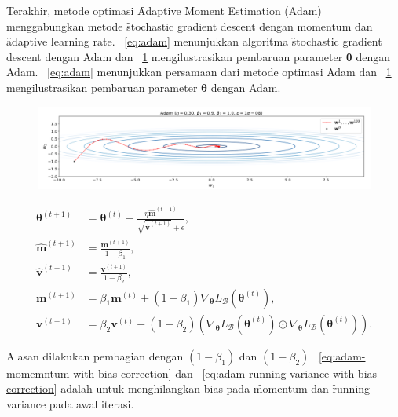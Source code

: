 Terakhir, metode optimasi \f{Adaptive Moment Estimation} (Adam) menggabungkan metode \f{stochastic gradient descent} dengan momentum dan \f{adaptive learning rate}. \equ~\ref{eq:adam} menunjukkan algoritma \f{stochastic gradient descent} dengan Adam dan \pic~\ref{fig:adam} mengilustrasikan pembaruan parameter $\bm{\theta}$ dengan Adam. \equ~\ref{eq:adam} menunjukkan persamaan dari metode optimasi Adam dan \pic~\ref{fig:adam} mengilustrasikan pembaruan parameter $\bm{\theta}$ dengan Adam.
\begin{figure}[!ht]
    \centering
    \includegraphics[width=1\textwidth]{assets/pics/adam.png}
    \label{fig:adam}
\end{figure}
\begin{align}
    \label{eq:adam}
    \bm{\theta}^{(t+1)} &= \bm{\theta}^{(t)} - \frac{\eta \hat{\mathbf{m}}^{(t+1)}}{\sqrt{\hat{\mathbf{v}}^{(t+1)}} + \epsilon}, \\
    \label{eq:adam-momemntum-with-bias-correction}
    \hat{\mathbf{m}}^{(t+1)} &= \frac{\mathbf{m}^{(t+1)}}{1 - \beta_1}, \\
    \label{eq:adam-running-variance-with-bias-correction}
    \hat{\mathbf{v}}^{(t+1)} &= \frac{\mathbf{v}^{(t+1)}}{1 - \beta_2}, \\
    \mathbf{m}^{(t+1)} &= \beta_1 \mathbf{m}^{(t)} + (1 - \beta_1) \nabla_{\bm{\theta}} L_{\mathcal{B}}(\bm{\theta}^{(t)}), \\
    \mathbf{v}^{(t+1)} &= \beta_2 \mathbf{v}^{(t)} + (1 - \beta_2) \left(\nabla_{\bm{\theta}} L_{\mathcal{B}}(\bm{\theta}^{(t)})\odot \nabla_{\bm{\theta}} L_{\mathcal{B}}(\bm{\theta}^{(t)})\right).
\end{align}

Alasan dilakukan pembagian dengan $(1-\beta_1)$ dan $(1-\beta_2)$ \equ~\ref{eq:adam-momemntum-with-bias-correction} dan \equ~\ref{eq:adam-running-variance-with-bias-correction} adalah untuk menghilangkan bias pada \f{momentum} dan \f{running variance} pada awal iterasi.



